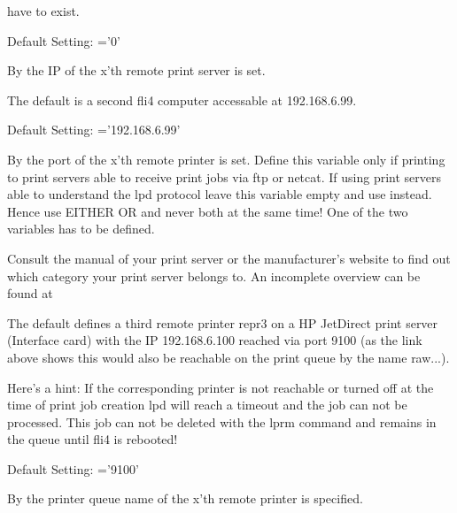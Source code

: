\begin{description}
  have to exist.

  Default Setting: ='0'



  By  the IP of the x'th remote print server is set.

  The default is a second fli4 computer accessable at 192.168.6.99.

  Default Setting: ='192.168.6.99'



  By  the port of the x'th remote printer is set.
  Define this variable only if printing to print servers able to receive print
  jobs via ftp or netcat. If using print servers able to understand the lpd
  protocol leave this variable empty and use 
  instead.
  Hence use EITHER  OR
   and never
  both at the same time! One of the two variables has to be defined.

  Consult the manual of your print server or the manufacturer's website to find
  out which category your print server belongs to.
  An incomplete overview can be found at


  The default defines a third remote printer repr3 on a HP JetDirect print server
  (Interface card) with the IP 192.168.6.100 reached via port 9100 (as the link above
  shows this would also be reachable on the print queue by the name raw...).

  Here's a hint:
  If the corresponding printer is not reachable or turned off at the time of print
  job creation lpd will reach a timeout and the job can not be processed. This job
  can not be deleted with the lprm command and remains in the queue until fli4 is
  rebooted!

  Default Setting: ='9100'



  By  the printer queue name of the x'th
  remote printer is specified.


\end{description}
